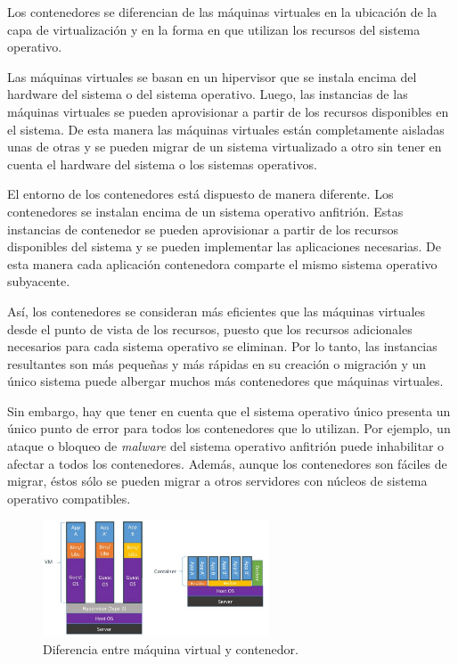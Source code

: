 Los contenedores se diferencian de las máquinas virtuales en la ubicación de la capa de virtualización y en la forma en que utilizan los recursos del sistema operativo.

Las máquinas virtuales se basan en un hipervisor que se instala encima del hardware del sistema o del sistema operativo. Luego, las instancias de las máquinas virtuales se pueden aprovisionar a partir de los recursos disponibles en el sistema. De esta manera las máquinas virtuales están completamente aisladas unas de otras y se pueden migrar de un sistema virtualizado a otro sin tener en cuenta el hardware del sistema o los sistemas operativos.

El entorno de los contenedores está dispuesto de manera diferente. Los contenedores se instalan encima de un sistema operativo anfitrión. Estas instancias de contenedor se pueden aprovisionar a partir de los recursos disponibles del sistema y se pueden implementar las aplicaciones necesarias. De esta manera cada aplicación contenedora comparte el mismo sistema operativo subyacente.

Así, los contenedores se consideran más eficientes que las máquinas virtuales desde el punto de vista de los recursos, puesto que los recursos adicionales necesarios para cada sistema operativo se eliminan. Por lo tanto, las instancias resultantes son más pequeñas y más rápidas en su creación o migración y un único sistema puede albergar muchos más contenedores que máquinas virtuales.

Sin embargo, hay que tener en cuenta que el sistema operativo único presenta un único punto de error para todos los contenedores que lo utilizan. Por ejemplo, un ataque o bloqueo de \textit{malware} del sistema operativo anfitrión puede inhabilitar o afectar a todos los contenedores. Además, aunque los contenedores son fáciles de migrar, éstos sólo se pueden migrar a otros servidores con núcleos de sistema operativo compatibles.

\begin{figure}[H]
\centering
\includegraphics[width=0.6\textwidth]{images/figures/containervsmv.png}
\caption{Diferencia entre máquina virtual y contenedor.\footnotemark}
\end{figure}

